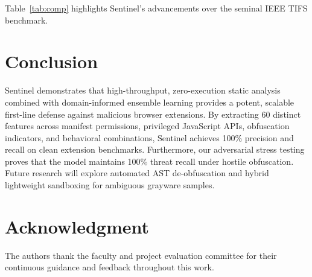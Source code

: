 \documentclass[conference]{IEEEtran}
\begin{document}
\begin{table}[!t]
\centering
\caption{Architectural Comparison: Sentinel vs. Benchmark (Wang et al.)}
\label{tab:comp}
\end{table}

Table~\ref{tab:comp} highlights Sentinel's advancements over the seminal IEEE TIFS benchmark.

\section{Conclusion}
Sentinel demonstrates that high-throughput, zero-execution static analysis combined with domain-informed ensemble learning provides a potent, scalable first-line defense against malicious browser extensions. By extracting 60 distinct features across manifest permissions, privileged JavaScript APIs, obfuscation indicators, and behavioral combinations, Sentinel achieves 100\% precision and recall on clean extension benchmarks. Furthermore, our adversarial stress testing proves that the model maintains 100\% threat recall under hostile obfuscation. Future research will explore automated AST de-obfuscation and hybrid lightweight sandboxing for ambiguous grayware samples.

\section*{Acknowledgment}
The authors thank the faculty and project evaluation committee for their continuous guidance and feedback throughout this work.
\end{document}
